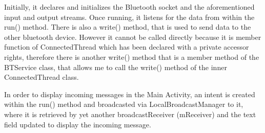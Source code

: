 \documentclass[12pt,a4paper]{article}
\begin{document}
    Initially, it declares and initializes the Bluetooth socket and the aforementioned input and output streams. Once running, it listens for the data from within the run() method. There is also a write() method, that is used to send data to the other bluetooth device. However it cannot be called directly because it is member function of ConnectedThread which has been declared with a private accessor rights, therefore there is another write() method that is a member method of the BTService class, that allows me to call the write() method of the inner ConnectedThread class.
    
    In order to display incoming messages in the Main Activity, an intent is created within the run() method and broadcasted via LocalBroadcastManager to it, where it is retrieved by yet another broadcastReceiver (mReceiver) and the text field updated to display the incoming message.~\cite{bib:uiLink}
    
\end{document}
